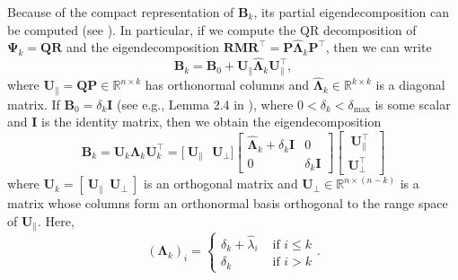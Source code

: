 Because of the compact representation of $\mathbf{B}_{k}$, 
its partial eigendecomposition can be computed (see  \citet{ErwM15}).  
In particular, if we compute the QR decomposition of $\mathbf{\Psi}_{k} = \mathbf{QR}$
and the eigendecomposition $\mathbf{RMR}^\top= \mathbf{P} \hat{\mathbf{\Lambda}}_{k} \mathbf{P}^\top$,
then we can write 
$$
\mathbf{B}_{k} = \mathbf{B}_0 + \mathbf{U}_{\parallel} \hat{\mathbf{\Lambda}}_{k} 
\mathbf{U}_{\parallel}^{\top},
$$
where $\mathbf{U}_{\parallel}  = \mathbf{QP} \in \mathbb{R}^{n \times k}$ has
orthonormal columns and $\hat{\mathbf{\Lambda}}_{k} \in \mathbb{R}^{k \times k}$ 
is a  diagonal matrix.  
If $\mathbf{B}_0 =  \delta_k \mathbf{I}$ (see e.g., Lemma 2.4 in  \citet{Erway2020TrustregionAF}), 
where $0 < \delta_k < \delta_{\max}$ is some scalar and $\mathbf{I}$ is the identity matrix, 
then we obtain the eigendecomposition 
\begin{equation}
\mathbf{B}_{k} = \mathbf{U}_{k}\mathbf{\Lambda}_{k}\mathbf{U}_{k}^{\top}
=
\bigg [ \ 
\mathbf{U}_{\parallel}  \ \ \ \mathbf{U}_{\perp}
\bigg ]
\begin{bmatrix}
\hat{\mathbf{\Lambda}}_{k} + \delta_k \mathbf{I} & 0 \\
0 & \delta_k \mathbf{I} 
\end{bmatrix}
\begin{bmatrix}
\ \mathbf{U}_{\parallel}^{\top} \ 
\\[.2cm]
\mathbf{U}_{\perp}^{\top}
\end{bmatrix}
\end{equation}
where $\mathbf{U}_{k} = [  \ \mathbf{U}_{\parallel}  \ \ \mathbf{U}_{\perp} \ ]$ is an orthogonal 
matrix and
$\mathbf{U}_{\perp} \in \mathbb{R}^{n \times (n-k)}$ is a matrix
whose columns form an orthonormal basis orthogonal to the range space of $\mathbf{U}_{\parallel}$.
Here, 
\begin{equation}
	(\mathbf{\Lambda}_{k})_i =
	\begin{cases}  
	\delta_k + \hat{\lambda}_i & \text{ if $i \le k$} \\
	\delta_k & \text{ if $i > k$}
	\end{cases}.
\end{equation}



